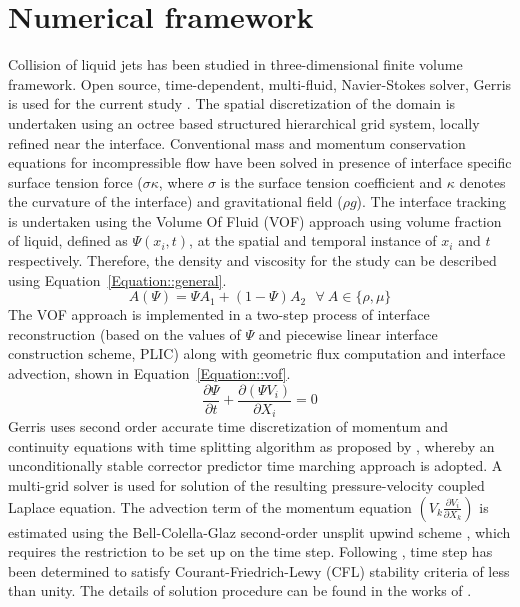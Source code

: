 \documentclass{jfm}
\begin{document}
\section{Numerical framework}
Collision of liquid jets has been studied in three-dimensional  finite volume framework. Open source, time-dependent, multi-fluid, Navier-Stokes solver, Gerris is used for the current study \citep{Popinet2003}. The spatial discretization of the domain is undertaken using an octree based structured hierarchical grid system, locally refined near the interface. Conventional mass and momentum conservation equations for incompressible flow have been solved in presence of interface specific surface tension force ($\sigma \kappa$, where $\sigma$ is the surface tension coefficient and $\kappa$ denotes the curvature of the interface) and gravitational field ($\rho g$). The interface tracking is undertaken using the Volume Of Fluid (VOF) approach using volume fraction of liquid, defined as $\Psi(x_i, t)$, at the spatial and temporal instance of $x_i$ and $t$ respectively. Therefore, the density and viscosity for the study can be described using Equation~\ref{Equation::general}.
\begin{equation} \label{Equation::general}
	A (\Psi) = \Psi A_1 + (1-\Psi)A_2 \: \: \:  \forall  \: A \in \{\rho, \mu\}
\end{equation}
The VOF approach is implemented in a two-step process of interface reconstruction (based on the values of $\Psi$ and piecewise linear interface construction scheme, PLIC) along with geometric flux computation and interface advection, shown in Equation~\ref{Equation::vof}.
\begin{equation} \label{Equation::vof}
	\frac{\partial \Psi}{\partial t} + \frac{\partial(\Psi V_i)}{\partial X_i} = 0
\end{equation}
Gerris uses second order accurate time discretization of momentum and continuity equations with time splitting algorithm as proposed by \cite{Chorin1968}, whereby an unconditionally stable corrector predictor time marching approach is adopted. A multi-grid solver is used for solution of the resulting pressure-velocity coupled Laplace equation. The advection term of the momentum equation $\left(V_k\frac{\partial V_i}{\partial X_k}\right)$ is estimated using the Bell-Colella-Glaz second-order unsplit upwind scheme \citep{bell1989second}, which requires the restriction to be set up on the time step. Following \cite{popinet2009}, time step has been determined to satisfy Courant-Friedrich-Lewy (CFL) stability criteria of less than unity. The details of solution procedure can be found in the works of \cite{Popinet2003,popinet2009}.\\
\end{document}
